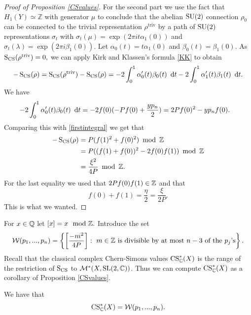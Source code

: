 \begin{proof}[Proof of Proposition \ref{CSvalues}]
For the second part we use the fact that $H_1(Y) \simeq \mathbb{Z}$ with generator $\mu$ to conclude that the abelian $\operatorname{SU}(2)$ connection $\rho_0$ can be connected to the trivial representation $\rho^{\text{triv}}$ by a path of $\operatorname{SU}(2)$ representations $\sigma_t$ with $ \sigma_t(\mu)=\exp(2\pi it \alpha_1(0))$ and $ \sigma_t(\lambda)=\exp(2\pi i \beta_1(0)).$ Let $\alpha_0(t)=t\alpha_1(0)$ and $\beta_0(t)=\beta_1(0).$ As $\operatorname{S_{CS}}(\rho^{\text{triv}})=0,$ we can apply Kirk and Klassen's formula  \eqref{KK} to obtain
\begin{equation}
-\operatorname{S_{CS}}(\rho) = \operatorname{S_{CS}}(\rho^{\text{triv}})-\operatorname{S_{CS}}(\rho)= -2 \int_0^1 \alpha'_0(t)\beta_0(t) \ \operatorname{{d}\hskip-.6mm} t-2\int_0^1 \alpha'_1(t)\beta_1(t) \ \operatorname{{d}\hskip-.6mm} t.
\end{equation}
We have
\begin{align}
-2\int_0^1 \alpha'_0(t)\beta_0(t) \ \operatorname{{d}\hskip-.6mm} t&=-2f(0)(-Pf(0)+\frac{yp_n}{2})=2Pf(0)^2-yp_nf(0).
\end{align}
Comparing this with \eqref{firstintegral} we get that
\begin{align}
-\operatorname{S_{CS}}(\rho) & = P(f(1)^2+f(0)^2) \ \operatorname{mod} \ \mathbb{Z}
\\ &=P((f(1)+f(0))^2-2f(0)f(1)) \ \operatorname{mod} \ \mathbb{Z}
\\ &= \frac{\xi^2}{4P} \ \operatorname{mod} \ \mathbb{Z}.
\end{align}
For the last equality we used that $2Pf(0)f(1)\in \mathbb{Z}$ and that $$f(0)+f(1)=\frac{\eta}{2}=\frac{\xi}{2P}.$$
This is what we wanted.  \end{proof}

For $x \in \mathbb{Q}$ let $[x]=x \mod  {\mathbb{Z}}.$ Introduce the set \begin{multline} \mathcal{W}(p_1,...,p_n)= \left\{ \left[ \frac{-m^2}{4P}\right]  : \text{  $m \in \mathbb{Z}$ is divisible by at most $n-3$ of the $p_j$'s}\right\}.
\end{multline}
Recall that the classical complex Chern-Simons values $\operatorname{CS}^*_{\mathbb{C}}(X)$ is the range of the restriction of $\operatorname{S_{CS}}$ to $\mathcal{M}^*(X,\operatorname{SL}(2,\mathbb{C}))$. Thus we can compute $\operatorname{CS}_{\mathbb{C}}^*(X)$ as a corollary of Proposition \ref{CSvalues}.

\begin{corollary} \label{cor:HUHU} We have that
\begin{equation}
\operatorname{CS}^*_{\mathbb{C}}(X)= \mathcal{W}(p_1,...,p_n).
\end{equation}
\end{corollary}


